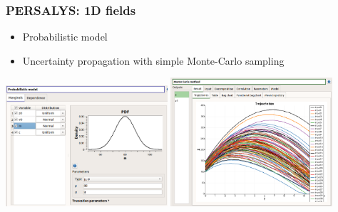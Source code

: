 \documentclass{beamer}
\begin{document}
\begin{frame}
\frametitle{PERSALYS: 1D fields}
	
\begin{itemize}
\item Probabilistic model
\item Uncertainty propagation with simple Monte-Carlo sampling
\end{itemize}

\begin{center}
\includegraphics[width=0.45\textwidth]{figures/persalys-field-probabilistic-model.png}
\includegraphics[width=0.45\textwidth]{figures/persalys-field-montecarlo-trajectories-extract.png}
\end{center}

\end{frame}

\end{document}
